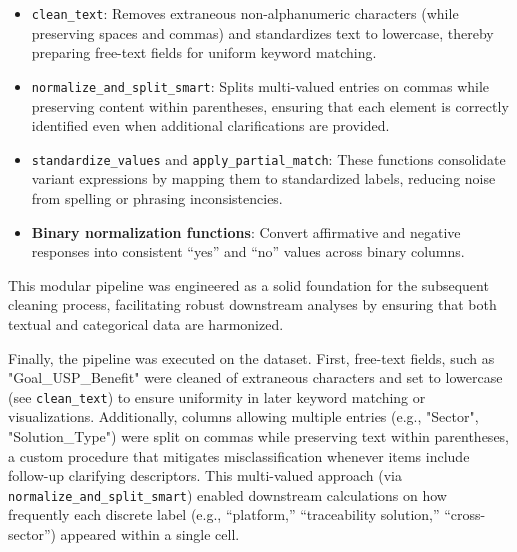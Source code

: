 \begin{itemize}[itemsep=0.5\baselineskip]
    \item \verb|clean_text|: Removes extraneous non-alphanumeric characters (while preserving spaces and commas) and standardizes text to lowercase, thereby preparing free-text fields for uniform keyword matching.

    \item \verb|normalize_and_split_smart|: Splits multi-valued entries on commas while preserving content within parentheses, ensuring that each element is correctly identified even when additional clarifications are provided.
    
    \item \verb|standardize_values| and \verb|apply_partial_match|: These functions consolidate variant expressions by mapping them to standardized labels, reducing noise from spelling or phrasing inconsistencies.
    
    \item \textbf{Binary normalization functions}: Convert affirmative and negative responses into consistent “yes” and “no” values across binary columns.
\end{itemize}

This modular pipeline was engineered as a solid foundation for the subsequent cleaning process, facilitating robust downstream analyses by ensuring that both textual and categorical data are harmonized.

Finally, the pipeline was executed on the dataset. First, free-text fields, such as "Goal\_USP\_Benefit" were cleaned of extraneous characters and set to lowercase (see \verb|clean_text|) to ensure uniformity in later keyword matching or visualizations. Additionally, columns allowing multiple entries (e.g., "Sector", "Solution\_Type") were split on commas while preserving text within parentheses, a custom procedure that mitigates misclassification whenever items include follow-up clarifying descriptors. This multi-valued approach (via \verb|normalize_and_split_smart|) enabled downstream calculations on how frequently each discrete label (e.g., “platform,” “traceability solution,” “cross-sector”) appeared within a single cell.

